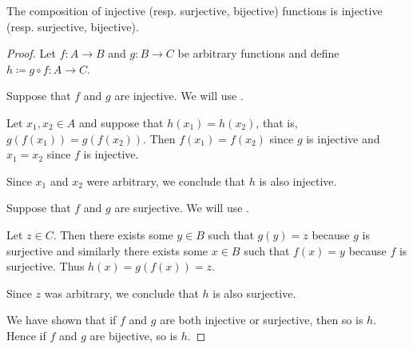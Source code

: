 \begin{proposition}\label{thm:function_composition_invertibility}
  The composition of injective (resp. surjective, bijective) functions is injective (resp. surjective, bijective).
\end{proposition}
\begin{proof}
  Let \( f: A \to B \) and \( g: B \to C \) be arbitrary functions and define \( h \coloneqq g \circ f: A \to C \).

   Suppose that \( f \) and \( g \) are injective. We will use .

  Let \( x_1, x_2 \in A \) and suppose that \( h(x_1) = h(x_2) \), that is, \( g(f(x_1)) = g(f(x_2)) \). Then \( f(x_1) = f(x_2) \) since \( g \) is injective and \( x_1 = x_2 \) since \( f \) is injective.

  Since \( x_1 \) and \( x_2 \) were arbitrary, we conclude that \( h \) is also injective.

   Suppose that \( f \) and \( g \) are surjective. We will use .

  Let \( z \in C \). Then there exists some \( y \in B \) such that \( g(y) = z \) because \( g \) is surjective and similarly there exists some \( x \in B \) such that \( f(x) = y \) because \( f \) is surjective. Thus \( h(x) = g(f(x)) = z \).

  Since \( z \) was arbitrary, we conclude that \( h \) is also surjective.

   We have shown that if \( f \) and \( g \) are both injective or surjective, then so is \( h \). Hence if \( f \) and \( g \) are bijective, so is \( h \).
\end{proof}

